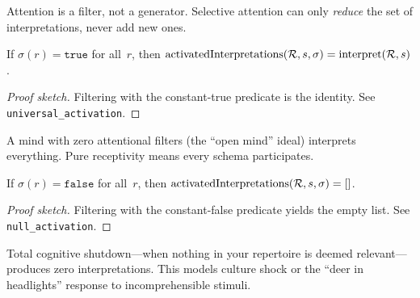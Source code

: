 \begin{remark}
Attention is a filter, not a generator.  Selective attention can only
\emph{reduce} the set of interpretations, never add new ones.
\end{remark}

\begin{theorem}[Universal Activation = Full Interpretation]
\label{thm:universal-activation}
If $\sigma(r) = \mathtt{true}$ for all~$r$, then
$\operatorname{activatedInterpretations}(\mathcal{R}, s, \sigma)
 = \operatorname{interpret}(\mathcal{R}, s)$.
\end{theorem}

\begin{proof}[Proof sketch]
Filtering with the constant-true predicate is the identity.
See \texttt{universal\_activation}.
\end{proof}

\begin{remark}
A mind with zero attentional filters (the ``open mind'' ideal) interprets
everything.  Pure receptivity means every schema participates.
\end{remark}

\begin{theorem}[Null Activation = Empty Interpretation]
\label{thm:null-activation}
If $\sigma(r) = \mathtt{false}$ for all~$r$, then
$\operatorname{activatedInterpretations}(\mathcal{R}, s, \sigma) = []$.
\end{theorem}

\begin{proof}[Proof sketch]
Filtering with the constant-false predicate yields the empty list.
See \texttt{null\_activation}.
\end{proof}

\begin{remark}
Total cognitive shutdown---when nothing in your repertoire is deemed
relevant---produces zero interpretations.  This models culture shock or
the ``deer in headlights'' response to incomprehensible stimuli.
\end{remark}

